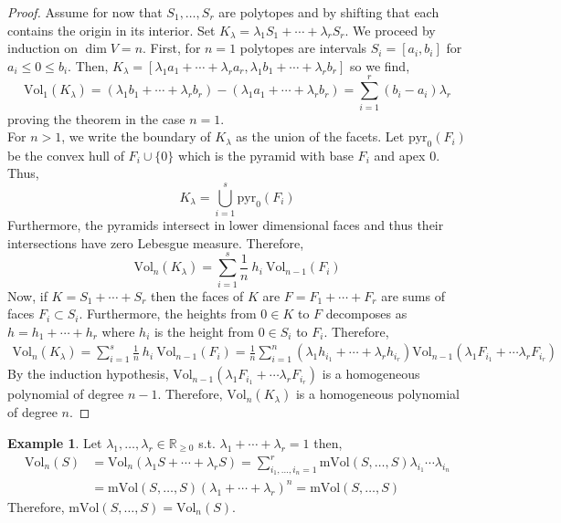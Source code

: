 \documentclass[12pt]{extarticle}
\newcommand{\R}{\mathbb{R}}
\theoremstyle{definition}
\newtheorem{example}[theorem]{Example}
\newcommand{\Vol}[2]{\mathrm{Vol}_{#1}\left( #2 \right)}
\newcommand{\mVol}[1]{\mathrm{mVol}\left( #1 \right)}
\begin{document}
\begin{proof}
Assume for now that $S_1, \dots, S_r$ are polytopes and by shifting that each contains the origin in its interior. Set $K_\lambda = \lambda_1 S_1 + \cdots + \lambda_r S_r$. We proceed by induction on $\dim{V} = n$. First, for $n = 1$ polytopes are intervals $S_i = [a_i, b_i]$ for $a_i \le 0 \le b_i$. Then, $K_\lambda = [\lambda_1 a_1 + \cdots + \lambda_r a_r, \lambda_1 b_1 + \cdots + \lambda_r b_r]$ so we find,
\[ \Vol{1}{K_\lambda} = (\lambda_1 b_1 + \cdots + \lambda_r b_r) - (\lambda_1 a_1 + \cdots + \lambda_r b_r) = \sum_{i = 1}^r (b_i - a_i) \lambda_r \]
proving the theorem in the case $n = 1$. 
\bigskip\\
For $n > 1$, we write the boundary of $K_\lambda$ as the union of the facets. Let $\mathrm{pyr}_0(F_i)$ be the convex hull of $F_i \cup \{ 0 \}$ which is the pyramid with base $F_i$ and apex $0$. Thus,
\[ K_\lambda = \bigcup_{i = 1}^s \mathrm{pyr}_0(F_i) \]
Furthermore, the pyramids intersect in lower dimensional faces and thus their intersections have zero Lebesgue measure. Therefore,
\[ \Vol{n}{K_\lambda} = \sum_{i = 1}^s \frac{1}{n} \: h_i \: \Vol{n-1}{F_i} \]
Now, if $K = S_1 + \cdots + S_r$ then the faces of $K$ are $F = F_1 + \cdots + F_r$ are sums of faces $F_i \subset S_i$. Furthermore, the heights from $0 \in K$ to $F$ decomposes as $h = h_1 + \cdots + h_r$ where $h_i$ is the height from $0 \in S_i$ to $F_i$. Therefore,
\begin{align*}
\Vol{n}{K_\lambda} = \sum_{i = 1}^s \frac{1}{n} \: h_i \: \Vol{n-1}{F_i} = \frac{1}{n} \sum_{i = 1}^n (\lambda_1 h_{i_1} + \cdots + \lambda_r h_{i_r} ) \Vol{n-1}{\lambda_1 F_{i_1} + \cdots \lambda_r F_{i_r}} 
\end{align*}
By the induction hypothesis, $\Vol{n-1}{\lambda_1 F_{i_1} + \cdots \lambda_r F_{i_r}}$ is a homogeneous polynomial of degree $n - 1$. Therefore, $\Vol{n}{K_\lambda}$ is a homogeneous polynomial of degree $n$. 
\end{proof}

\begin{example}
Let $\lambda_1, \dots, \lambda_r \in \R_{\ge 0}$ s.t. $\lambda_1 + \cdots + \lambda_r = 1$ then,
\begin{align*}
\Vol{n}{S} & = \Vol{n}{\lambda_1 S + \cdots + \lambda_r S} = \sum_{i_1, \dots, i_n = 1}^r \mVol{S, \dots, S} \lambda_{i_1} \cdots \lambda_{i_n}
\\
& = \mVol{S, \dots, S} \left( \lambda_1 + \cdots + \lambda_r \right)^n = \mVol{S, \dots, S} 
\end{align*}
Therefore, $\mVol{S, \dots, S} = \Vol{n}{S}$. 
\end{example}
\end{document}
